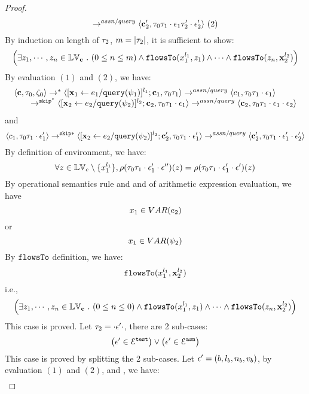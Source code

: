 \begin{proof}
\[  \rightarrow^{assn/query} 
  \langle {\boldsymbol{\mathbf{c}}}_2',  \mathtt{\tau}_0 \mathtt{\tau}_1 \cdot \mathtt{\epsilon}_1 \mathtt{\tau}_2' \cdot \mathtt{\epsilon}_2' \rangle 
 ~(2)
 \]
%
By induction on length of $\mathtt{\tau}_2$, $m = |\mathtt{\tau}_2|$, it is sufficient to show:
%
 \[
 \Big( \exists z_1, \cdots, z_n \in \mathbb{LV}_{{\boldsymbol{\mathbf{c}}}} ~.~ (0 \leq n \leq m )
 \land \mathtt{flowsTo}(x_1^{l_1}, z_1) \land \cdots \land \mathtt{flowsTo}(z_n, {\boldsymbol{\mathbf{x}}}_2^{l_2}) \Big)
  \]
 By evaluation $(1)$ and $(2)$, we have:
\[
  \begin{array}{l}   
\langle {\boldsymbol{\mathbf{c}}}, \mathtt{\tau}_0, \mathtt{\zeta}_0 \rangle \rightarrow^{*} 
\langle [\mathrel{ {\boldsymbol{\mathbf{x}}}_1 \leftarrow e_1 / {\tt query}(\psi_1) }]^{l_1} ; {\boldsymbol{\mathbf{c}}}_1, \mathtt{\tau}_0 \mathtt{\tau}_1 \rangle  \rightarrow^{assn/query}
 \langle c_1, \mathtt{\tau}_0 \mathtt{\tau}_1 \cdot \mathtt{\epsilon}_1 \rangle \\
  \qquad \rightarrow^{\mathtt{skip}^*} 
  \langle [\mathrel{ {\boldsymbol{\mathbf{x}}}_2 \leftarrow e_2 / {\tt query}(\psi_2) }]^{l_2};{\boldsymbol{\mathbf{c}}}_2, 
  \mathtt{\tau}_0 \mathtt{\tau}_1 \cdot \mathtt{\epsilon}_1 \rangle 
  \rightarrow^{assn/query} 
  \langle {\boldsymbol{\mathbf{c}}}_2,  \mathtt{\tau}_0 \mathtt{\tau}_1 \cdot \mathtt{\epsilon}_1 \cdot \mathtt{\epsilon}_2 \rangle 
\end{array}
 \]
 and 
  \[
  \langle c_1, \mathtt{\tau}_0 \mathtt{\tau}_1 \cdot \mathtt{\epsilon}_1' \rangle 
  \rightarrow^{\mathtt{skip}*} 
  \langle [\mathrel{ {\boldsymbol{\mathbf{x}}}_2 \leftarrow e_2 / {\tt query}(\psi_2) }]^{l_2} ; {\boldsymbol{\mathbf{c}}}_2', \mathtt{\tau}_0 \mathtt{\tau}_1 \cdot \mathtt{\epsilon}_1' \rangle 
  \rightarrow^{assn/query} 
  \langle {\boldsymbol{\mathbf{c}}}_2',  \mathtt{\tau}_0 \mathtt{\tau}_1 \cdot \mathtt{\epsilon}_1' \cdot \mathtt{\epsilon}_2' \rangle 
 \]
%
By definition of environment, we have:
\[
  \forall z \in \mathbb{LV}_c \setminus \{x_1^{l_1}\} ,
  \rho(\mathtt{\tau}_0 \mathtt{\tau}_1 \cdot \mathtt{\epsilon}_1' \cdot \mathtt{\epsilon}'') (z) =  
  \rho(\mathtt{\tau}_0 \mathtt{\tau}_1 \cdot \mathtt{\epsilon}_1' \cdot \mathtt{\epsilon}') (z)
\]
%
By operational semantics rule  and  and  of arithmetic expression evaluation, we have 
\[
  x_1 \in VAR(e_2)
\]
or
\[
  x_1 \in VAR(\psi_2)
\]
%
By $\mathtt{flowsTo}$ definition, we have:
%
\[
\mathtt{flowsTo}(x_1^{l_1}, {\boldsymbol{\mathbf{x}}}_2^{l_2})
\]
i.e.,
%
\[
 \Big( \exists z_1, \cdots, z_n \in \mathbb{LV}_{{\boldsymbol{\mathbf{c}}}} ~.~ (0 \leq n \leq 0 )
 \land \mathtt{flowsTo}(x_1^{l_1}, z_1) \land \cdots \land \mathtt{flowsTo}(z_n, {\boldsymbol{\mathbf{x}}}_2^{l_2}) \Big)
\]
%
This case is proved.
%
%
Let $\mathtt{\tau}_2 = \cdot \mathtt{\epsilon}' \cdot$, there are 2 sub-cases: 
%
 \[
 \big(\mathtt{\epsilon}' \in \mathcal{E}^{\mathtt{{test}}}\big) \lor \big(\mathtt{\epsilon}' \in \mathcal{E}^{\mathtt{{asn}}}\big)
 \]
%
This case is proved by splitting the 2 sub-cases.
%
Let $\mathtt{\epsilon}' = (b, l_b, n_b, v_b)$, by evaluation $(1)$ and $(2)$, and , we have:
\[
  \begin{array}{l}   

\end{array}\]
\end{proof}
